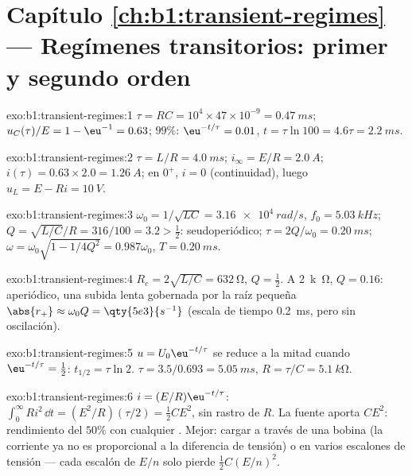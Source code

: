 \section*{Capítulo \ref{ch:b1:transient-regimes} --- Regímenes transitorios: primer y segundo orden}

\begin{solution}{exo:b1:transient-regimes:1}
$\tau = RC = 10^4 \times 47\times10^{-9} = \qty{0.47}{ms}$; $u_C(\tau)/E
= 1 - \eu^{-1} = 0.63$; $99\%$: $\eu^{-t/\tau} = 0.01$, $t = \tau\ln 100
= 4.6\tau = \qty{2.2}{ms}$.
\end{solution}

\begin{solution}{exo:b1:transient-regimes:2}
$\tau = L/R = \qty{4.0}{ms}$; $i_\infty = E/R = \qty{2.0}{A}$; $i(\tau) =
0.63 \times 2.0 = \qty{1.26}{A}$; en $0^+$, $i = 0$ (continuidad), luego
$u_L = E - Ri = \qty{10}{V}$.
\end{solution}

\begin{solution}{exo:b1:transient-regimes:3}
$\omega_0 = 1/\sqrt{LC} = \qty{3.16e4}{rad/s}$, $f_0 = \qty{5.03}{kHz}$;
$Q = \sqrt{L/C}/R = 316/100 = 3.2 > \tfrac12$: seudoperiódico;
$\tau = 2Q/\omega_0 = \qty{0.20}{ms}$; $\omega = \omega_0\sqrt{1 - 1/4Q^2}
= 0.987\omega_0$, $T = \qty{0.20}{ms}$.
\end{solution}

\begin{solution}{exo:b1:transient-regimes:4}
$R_c = 2\sqrt{L/C} = \qty{632}{\ohm}$, $Q = \tfrac12$. A \qty{2}{k\ohm},
$Q = 0.16$: aperiódico, una subida lenta gobernada por la raíz pequeña
$\abs{r_+} \approx \omega_0 Q = \qty{5e3}{s^{-1}}$ (escala de tiempo
\qty{0.2}{ms}, pero sin oscilación).
\end{solution}

\begin{solution}{exo:b1:transient-regimes:5}
$u = U_0\eu^{-t/\tau}$ se reduce a la mitad cuando $\eu^{-t/\tau} = \tfrac12$: $t_{1/2}
= \tau\ln 2$. $\tau = 3.5/0.693 = \qty{5.05}{ms}$, $R = \tau/C =
\qty{5.1}{k\ohm}$.
\end{solution}

\begin{solution}{exo:b1:transient-regimes:6}
$i = (E/R)\eu^{-t/\tau}$: $\int_0^\infty Ri^2\,\dd t = (E^2/R)(\tau/2) =
\tfrac12 CE^2$, sin rastro de $R$. La fuente aporta $CE^2$: rendimiento
del $50\%$ con cualquier . Mejor: cargar a través de una bobina
(la corriente ya no es proporcional a la diferencia de tensión) o en
varios escalones de tensión --- cada escalón de $E/n$ solo pierde
$\tfrac12 C(E/n)^2$.
\end{solution}

